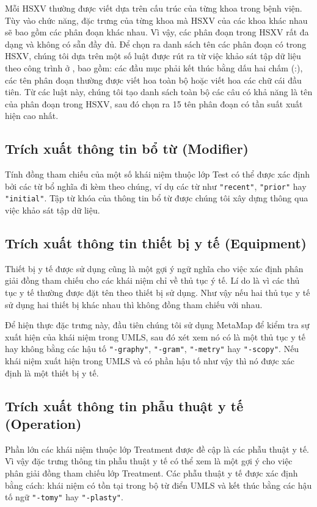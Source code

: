 Mỗi HSXV thường được viết dựa trên cấu trúc của từng khoa trong bệnh viện. Tùy vào chức năng, đặc trưng của từng khoa mà HSXV của các khoa khác nhau sẽ bao gồm các phân đoạn khác nhau. Vì vậy, các phân đoạn trong HSXV rất đa dạng và không có sẵn đầy đủ. Để chọn ra danh sách tên các phân đoạn có trong HSXV, chúng tôi dựa trên một số luật được rút ra từ việc khảo sát tập dữ liệu theo công trình ở \cite{RandolphMiller2008}, bao gồm: các đầu mục phải kết thúc bằng dấu hai chấm (:), các tên phân đoạn thường được viết hoa toàn bộ hoặc viết hoa các chữ cái đầu tiên. Từ các luật	 này, chúng tôi tạo danh sách toàn bộ các câu có khả năng là tên của phân đoạn trong HSXV, sau đó chọn ra 15 tên phân đoạn có tần suất xuất hiện cao nhất.

\subsection*{Trích xuất thông tin bổ từ (Modifier)}
Tính đồng tham chiếu của một số khái niệm thuộc lớp Test có thể được xác định bởi các từ bổ nghĩa đi kèm theo chúng, ví dụ các từ như \texttt{"recent"}, \texttt{"prior"} hay \texttt{"initial"}. Tập từ khóa của thông tin bổ từ được chúng tôi xây dựng thông qua việc khảo sát tập dữ liệu.

\subsection*{Trích xuất thông tin thiết bị y tế (Equipment)}
Thiết bị y tế được sử dụng cũng là một gợi ý ngữ nghĩa cho việc xác định phân giải đồng tham chiếu cho các khái niệm chỉ về thủ tục ý tế. Lí do là vì các thủ tục y tế thường được đặt tên theo thiết bị sử dụng. Như vậy nếu hai thủ tục y tế sử dụng hai thiết bị khác nhau thì không đồng tham chiếu với nhau. 

Để hiện thực đặc trưng này, đầu tiên chúng tôi sử dụng MetaMap để kiểm tra sự xuất hiện của khái niệm trong UMLS, sau đó xét xem nó có là một thủ tục y tế hay không bằng các hậu tố \texttt{"-graphy"}, \texttt{"-gram"}, \texttt{"-metry"} hay \texttt{"-scopy"}. Nếu khái niệm xuất hiện trong UMLS và có phần hậu tố như vậy thì nó được xác định là một thiết bị y tế.

\subsection*{Trích xuất thông tin phẫu thuật y tế (Operation)}
Phần lớn các khái niệm thuộc lớp Treatment được đề cập là các phẫu thuật y tế. Vì vậy đặc trưng thông tin phẫu thuật y tế có thể xem là một gợi ý cho việc phân giải đồng tham chiếu lớp Treatment. Các phẫu thuật y tế được xác định bằng cách: khái niệm có tồn tại trong bộ từ điển UMLS và kết thúc bằng các hậu tố ngữ \texttt{"-tomy"} hay \texttt{"-plasty"}.


